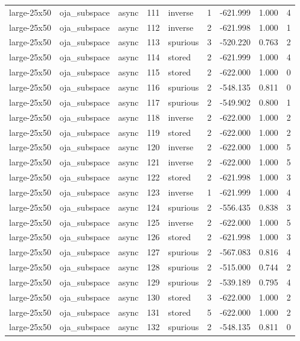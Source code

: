 \begin{tabular}{lllrlrrrr}
large-25x50 & oja\_subspace & async & 111 & inverse & 1 & -621.999 & 1.000 & 4 \\
large-25x50 & oja\_subspace & async & 112 & inverse & 2 & -621.998 & 1.000 & 1 \\
large-25x50 & oja\_subspace & async & 113 & spurious & 3 & -520.220 & 0.763 & 2 \\
large-25x50 & oja\_subspace & async & 114 & stored & 2 & -621.999 & 1.000 & 4 \\
large-25x50 & oja\_subspace & async & 115 & stored & 2 & -622.000 & 1.000 & 0 \\
large-25x50 & oja\_subspace & async & 116 & spurious & 2 & -548.135 & 0.811 & 0 \\
large-25x50 & oja\_subspace & async & 117 & spurious & 2 & -549.902 & 0.800 & 1 \\
large-25x50 & oja\_subspace & async & 118 & inverse & 2 & -622.000 & 1.000 & 2 \\
large-25x50 & oja\_subspace & async & 119 & stored & 2 & -622.000 & 1.000 & 2 \\
large-25x50 & oja\_subspace & async & 120 & inverse & 2 & -622.000 & 1.000 & 5 \\
large-25x50 & oja\_subspace & async & 121 & inverse & 2 & -622.000 & 1.000 & 5 \\
large-25x50 & oja\_subspace & async & 122 & stored & 2 & -621.998 & 1.000 & 3 \\
large-25x50 & oja\_subspace & async & 123 & inverse & 1 & -621.999 & 1.000 & 4 \\
large-25x50 & oja\_subspace & async & 124 & spurious & 2 & -556.435 & 0.838 & 3 \\
large-25x50 & oja\_subspace & async & 125 & inverse & 2 & -622.000 & 1.000 & 5 \\
large-25x50 & oja\_subspace & async & 126 & stored & 2 & -621.998 & 1.000 & 3 \\
large-25x50 & oja\_subspace & async & 127 & spurious & 2 & -567.083 & 0.816 & 4 \\
large-25x50 & oja\_subspace & async & 128 & spurious & 2 & -515.000 & 0.744 & 2 \\
large-25x50 & oja\_subspace & async & 129 & spurious & 2 & -539.189 & 0.795 & 4 \\
large-25x50 & oja\_subspace & async & 130 & stored & 3 & -622.000 & 1.000 & 2 \\
large-25x50 & oja\_subspace & async & 131 & stored & 5 & -622.000 & 1.000 & 2 \\
large-25x50 & oja\_subspace & async & 132 & spurious & 2 & -548.135 & 0.811 & 0 \\

\end{tabular}

